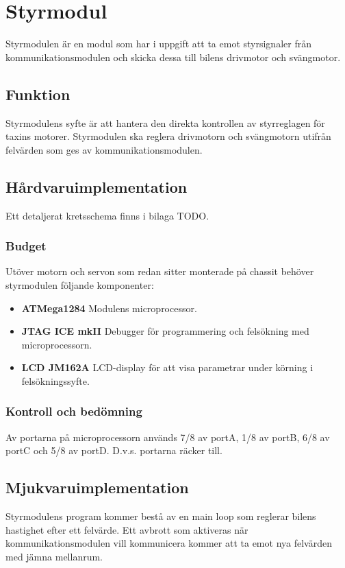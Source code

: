 \documentclass[designspec/spec.tex]{subfiles}
\begin{document}
\section{Styrmodul}
Styrmodulen är en modul som har i uppgift att ta emot styrsignaler från
kommunikationsmodulen och skicka dessa till bilens drivmotor och svängmotor.

\subsection{Funktion}
Styrmodulens syfte är att hantera den direkta kontrollen av styrreglagen för
taxins motorer. Styrmodulen ska reglera drivmotorn och svängmotorn utifrån
felvärden som ges av kommunikationsmodulen.

\subsection{Hårdvaruimplementation}
Ett detaljerat kretsschema finns i bilaga TODO.

\subsubsection{Budget}
Utöver motorn och servon som redan sitter monterade på chassit behöver
styrmodulen följande komponenter:

\begin{itemize}
	\item \textbf{ATMega1284} Modulens microprocessor. 
    \item \textbf{JTAG ICE mkII} Debugger för programmering och felsökning med
    microprocessorn. 
    \item \textbf{LCD JM162A} LCD-display för att visa parametrar under körning
    i felsökningssyfte.
\end{itemize}

\subsubsection{Kontroll och bedömning}
Av portarna på microprocessorn används 7/8 av portA, 1/8 av portB, 6/8 av portC
och 5/8 av portD. D.v.s. portarna räcker till. %


\subsection{Mjukvaruimplementation}
Styrmodulens program kommer bestå av en main loop som reglerar bilens hastighet
efter ett felvärde. Ett avbrott som aktiveras när kommunikationsmodulen vill
kommunicera kommer att ta emot nya felvärden med jämna mellanrum.
\end{document}
